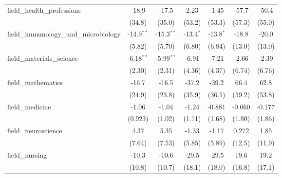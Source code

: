 \begin{tabular}{lcccccc}
   field\_health\_professions                                  & -18.9         & -17.5         & 2.23           & -1.45          & -57.7       & -50.4\\   
                                                               & (34.8)        & (35.0)        & (53.2)         & (53.3)         & (57.3)      & (55.0)\\   
   field\_immunology\_and\_microbiology                        & -14.9$^{**}$  & -15.3$^{**}$  & -13.4$^{*}$    & -13.8$^{*}$    & -18.8       & -20.0\\   
                                                               & (5.82)        & (5.70)        & (6.80)         & (6.84)         & (13.0)      & (13.0)\\   
   field\_materials\_science                                   & -6.18$^{**}$  & -5.99$^{**}$  & -6.91          & -7.21          & -2.66       & -2.39\\   
                                                               & (2.30)        & (2.31)        & (4.36)         & (4.37)         & (6.74)      & (6.76)\\   
   field\_mathematics                                          & -16.7         & -16.5         & -37.2          & -39.2          & 66.4        & 62.8\\   
                                                               & (24.9)        & (23.8)        & (35.9)         & (36.5)         & (59.2)      & (53.8)\\   
   field\_medicine                                             & -1.06         & -1.04         & -1.24          & -0.881         & -0.060      & -0.177\\   
                                                               & (0.923)       & (1.02)        & (1.71)         & (1.68)         & (1.80)      & (1.86)\\   
   field\_neuroscience                                         & 4.37          & 5.35          & -1.33          & -1.17          & 0.272       & 1.85\\   
                                                               & (7.64)        & (7.53)        & (5.85)         & (5.89)         & (12.5)      & (11.9)\\   
   field\_nursing                                              & -10.3         & -10.6         & -29.5          & -29.5          & 19.6        & 19.2\\   
                                                               & (10.8)        & (10.7)        & (18.1)         & (18.0)         & (16.8)      & (17.1)\\   

\end{tabular}
